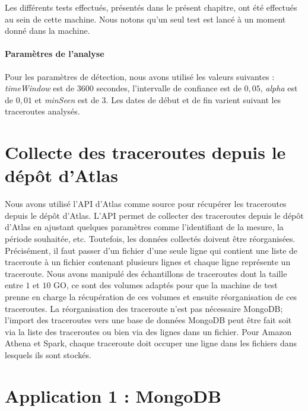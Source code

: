 Les différents tests effectués, présentés dans le présent chapitre, ont été effectués  au sein de cette machine. Nous notons qu'un seul test est lancé à un moment donné dans la machine.
\paragraph{Paramètres de l'analyse} Pour les paramètres de détection, nous avons utilisé les valeurs suivantes : \textit{timeWindow} est de $ 3600 $ secondes, l'intervalle de confiance est de $0,05$, \textit{alpha} est de $ 0,01 $ et \textit{minSeen} est de $3$. Les dates de début et de fin  varient suivant les traceroutes analysés.


\section{Collecte des traceroutes depuis le dépôt d'Atlas }
Nous avons utilisé l'API d'Atlas  comme source pour récupérer les traceroutes depuis le dépôt d'Atlas. L'API permet de collecter des traceroutes depuis le dépôt d'Atlas en ajustant quelques paramètres comme  l'identifiant de la mesure, la période souhaitée, etc. Toutefois, les données collectés doivent être réorganisées. Précisément, il faut passer d'un fichier d'une seule ligne qui contient une liste de traceroute à un fichier contenant plusieurs lignes et chaque ligne représente un traceroute. Nous avons manipulé des échantillons de traceroutes dont la taille entre $ 1 $ et $ 10 $ GO, ce sont des volumes  adaptés pour que la machine de test prenne en charge la récupération de ces volumes  et ensuite  réorganisation de ces traceroutes. 
La réorganisation des traceroute n'est pas nécessaire  MongoDB; l'import des traceroutes vers une base de données MongoDB peut être fait soit  via la liste des traceroutes ou bien via des lignes dans un fichier. Pour Amazon Athena et Spark, chaque traceroute doit occuper une  ligne dans les fichiers dans lesquels ils sont stockés. 

\section{Application 1 : MongoDB} \label{mongodb-impleme}


